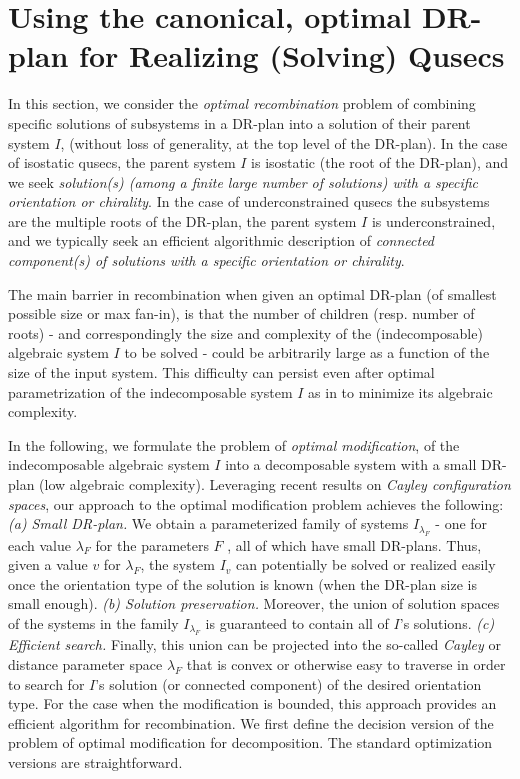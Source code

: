 \section{Using the canonical, optimal DR-plan for Realizing (Solving) Qusecs}
\label{sec:recomb}

In this section, we consider the {\em optimal recombination}
problem of combining specific solutions of
subsystems in a DR-plan into a solution of their parent system $I$, (without
loss of generality, at the top level of the DR-plan). In the case of isostatic
qusecs, the parent system $I$ is isostatic (the root of the DR-plan), and we
seek  {\em solution(s) (among a finite large number of solutions)
with a specific orientation or chirality}.
In the case of underconstrained qusecs the subsystems are the multiple roots
of the DR-plan, the parent system $I$ is underconstrained, and we typically seek
an efficient algorithmic description of {\em connected component(s) of solutions with a specific orientation or
chirality}.

The main barrier in recombination when given an optimal DR-plan (of smallest possible
size or max fan-in),  is that the number of children (resp. number of
roots) - and correspondingly the  size and complexity of the (indecomposable) algebraic
system $I$ to be solved -
could be arbitrarily large as a function of the size of the input system.
This difficulty can persist even after optimal parametrization of the
indecomposable system $I$ as in \cite{XX}
to minimize its algebraic complexity.

In the following, we formulate the problem of {\em optimal
modification},
of the indecomposable
algebraic system $I$ into a decomposable system with a small DR-plan (low
algebraic complexity).
Leveraging recent results on {\em Cayley
configuration spaces}, our approach to the optimal modification problem
achieves the following: {\em (a) Small DR-plan.} We obtain a  parameterized family of systems
$I_{\lambda_F}$ -  one for each value $\lambda_F$ for the parameters $F$ ,  all of which have
small DR-plans. Thus, given a value $v$ for $\lambda_F$, the system $I_v$ can
potentially be solved or realized easily once the orientation type of the solution
is known  (when the DR-plan size is small enough).
{\em (b) Solution preservation.} Moreover, the union of solution spaces of the systems in the family
$I_{\lambda_F}$
is guaranteed to contain
all of $I$'s solutions. {\em (c) Efficient search.} Finally, this union can be projected into the
so-called {\em Cayley} or distance parameter space $\lambda_F$ that is convex
or otherwise easy to traverse in order to search for $I$'s solution
(or connected component)
of the desired orientation type.
For the case when the modification is bounded, this approach provides an efficient
algorithm for recombination. We first define the decision version of the
problem of optimal modification
for decomposition. The standard optimization versions are straightforward.

